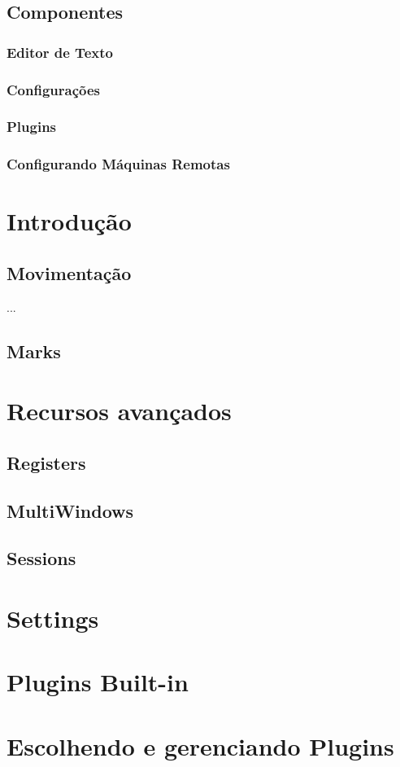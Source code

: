 \documentclass[a4paper, 12pt]{article}
\begin{document}
\subsection{Componentes}
\subsubsection{Editor de Texto}
\subsubsection{Configurações}
\subsubsection{Plugins}
\subsubsection{Configurando Máquinas Remotas}
\section{Introdução}
\subsection{Movimentação}
...
\subsection{Marks}
\section{Recursos avançados}
\subsection{Registers}
\subsection{MultiWindows}
\subsection{Sessions}
\section{Settings}
\section{Plugins Built-in}
\section{Escolhendo e gerenciando Plugins}
\end{document}
